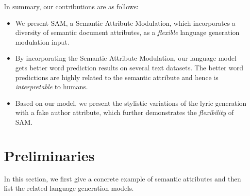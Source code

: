 \documentclass[a4paper]{article}
\newcommand{\method}{\xspace{SAM}}
\begin{document}

In summary, our contributions are as follows:
\begin{itemize}
\item We present \method, a Semantic Attribute Modulation, which incorporates a diversity of semantic document attributes, as a \emph{flexible} language generation modulation input.
\item By incorporating the Semantic Attribute Modulation, our language model gets better word prediction results on several text datasets. The better word predictions are highly related to the semantic attribute and hence is \emph{interpretable} to humans.
\item Based on our model, we present the stylistic variations of the lyric generation with a fake author attribute, which further demonstrates the \emph{flexibility} of \method.
\end{itemize}



\section{Preliminaries}
In this section, we first give a concrete example of semantic attributes and then list the related language generation models.
\end{document}
